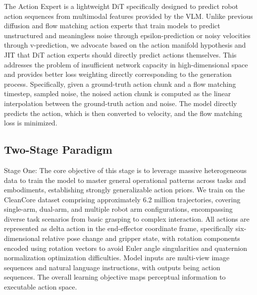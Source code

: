 \documentclass[11pt,a4paper]{article}
\begin{document}
The Action Expert is a lightweight DiT specifically designed to predict robot action sequences from multimodal features provided by the VLM. Unlike previous diffusion and flow matching action experts that train models to predict unstructured and meaningless noise through epsilon-prediction or noisy velocities through v-prediction, we advocate based on the action manifold hypothesis and JIT that DiT action experts should directly predict actions themselves. This addresses the problem of insufficient network capacity in high-dimensional space and provides better loss weighting directly corresponding to the generation process. Specifically, given a ground-truth action chunk and a flow matching timestep, sampled noise, the noised action chunk is computed as the linear interpolation between the ground-truth action and noise. The model directly predicts the action, which is then converted to velocity, and the flow matching loss is minimized.

\subsection{Two-Stage Paradigm}

Stage One: The core objective of this stage is to leverage massive heterogeneous data to train the model to master general operational patterns across tasks and embodiments, establishing strongly generalizable action priors. We train on the CleanCore dataset comprising approximately 6.2 million trajectories, covering single-arm, dual-arm, and multiple robot arm configurations, encompassing diverse task scenarios from basic grasping to complex interaction. All actions are represented as delta action in the end-effector coordinate frame, specifically six-dimensional relative pose change and gripper state, with rotation components encoded using rotation vectors to avoid Euler angle singularities and quaternion normalization optimization difficulties. Model inputs are multi-view image sequences and natural language instructions, with outputs being action sequences. The overall learning objective maps perceptual information to executable action space.
\end{document}
